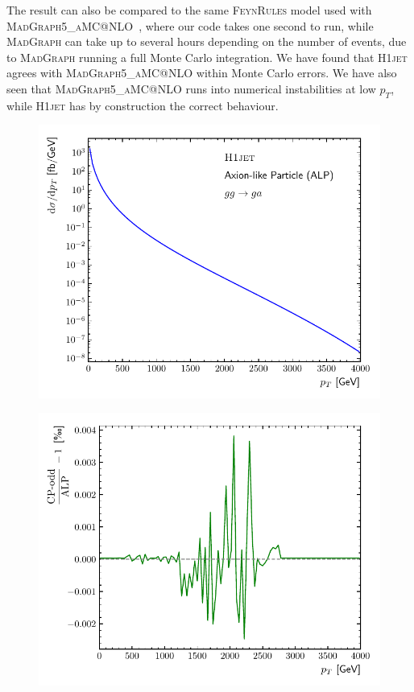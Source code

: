 \documentclass[12pt]{article}
\begin{document}
The result can also be compared to the same \textsc{FeynRules} model
used with \textsc{MadGraph5\_aMC@NLO}~\cite{Alwall:2014hca}, where our
code takes one second to run, while \textsc{MadGraph} can take up to
several hours depending on the number of events, due to
\textsc{MadGraph} running a full Monte Carlo integration. We have
found that \textsc{H1jet} agrees with \textsc{MadGraph5\_aMC@NLO}
within Monte Carlo errors. We have also seen that
\textsc{MadGraph5\_aMC@NLO} runs into numerical instabilities at low
$p_T$, while \textsc{H1jet} has by construction the correct behaviour.
\begin{figure}[tbh] 
\centering
\begin{minipage}{.485\textwidth}
  \centering
  \includegraphics[width=\linewidth]{figures/ALPresult}
  \label{fig:alpresult}
\end{minipage}%
\hfill%
\begin{minipage}{.485\textwidth}
  \centering
  \includegraphics[width=\linewidth]{figures/ALPratio}

\end{minipage}
\end{figure}
\end{document}
